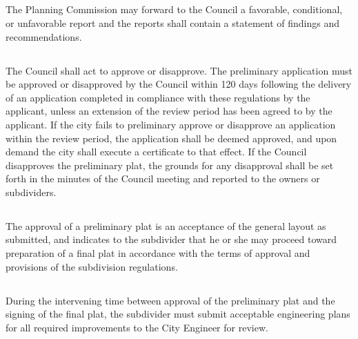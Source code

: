 \subsection{}
The Planning Commission may forward to the Council a favorable, conditional, or unfavorable report and the reports shall contain a statement of findings and recommendations.
\subsection{}
The Council shall act to approve or disapprove. The preliminary application must be approved or disapproved by the Council within 120 days following the delivery of an application completed in compliance with these regulations by the applicant, unless an extension of the review period has been agreed to by the applicant. If the city fails to preliminary approve or disapprove an application within the review period, the application shall be deemed approved, and upon demand the city shall execute a certificate to that effect. If the Council disapproves the preliminary plat, the grounds for any disapproval shall be set forth in the minutes of the Council meeting and reported to the owners or subdividers.
\subsection{}
The approval of a preliminary plat is an acceptance of the general layout as submitted, and indicates to the subdivider that he or she may proceed toward preparation of a final plat in accordance with the terms of approval and provisions of the subdivision regulations.
\subsection{}
During the intervening time between approval of the preliminary plat and the signing of the final plat, the subdivider must submit acceptable engineering plans for all required improvements to the City Engineer for review.
